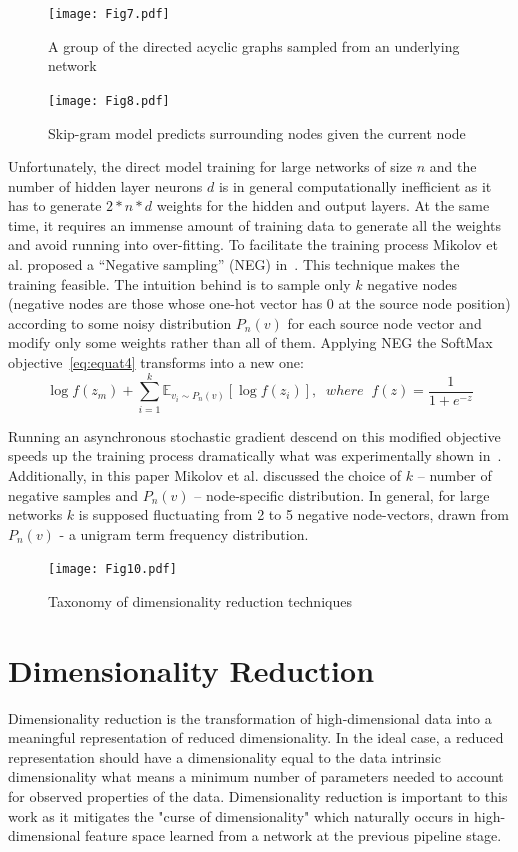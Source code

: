 \begin{figure}[H]
    \centering
    \texttt{[image: Fig7.pdf]}
    \caption{A group of the directed acyclic graphs sampled from an underlying network}
    \label{fig:Fig7}
\end{figure}
\begin{figure}[H]
    \centering
    \texttt{[image: Fig8.pdf]}
    \caption{Skip-gram model predicts surrounding nodes given the current node}
    \label{fig:Fig8}
\end{figure}

Unfortunately, the direct model training for large networks of size $n$ and the number of hidden layer neurons $d$ is in general computationally inefficient as it has to generate $2*n*d$ weights for the hidden and output layers. At the same time, it requires an immense amount of training data to generate all the weights and avoid running into over-fitting. 
To facilitate the training process Mikolov et al. proposed a “Negative sampling” (NEG) in~\cite{gutmann2012noise}. This technique makes the training feasible. The intuition behind is to sample only $k$ negative nodes (negative nodes are those whose one-hot vector has 0 at the source node position) according to some noisy distribution $P_n(v)$ for each source node vector and modify only some weights rather than all of them. Applying NEG the SoftMax objective~\autoref{eq:equat4} transforms into a new one:
\begin{equation}
  \log{f(z_m)} + \sum\limits_{i=1}^k \mathbb{E}_{v_i\sim P_n(v)} [\log{f(z_i)}],\;\; 
  where \;\; f(z)= \frac{1}{1+e^{-z}}
    \label{eq:equat5}
\end{equation}

Running an asynchronous stochastic gradient descend on this modified objective speeds up the training process dramatically what was experimentally shown in~\cite{Mikolov:Word2vec}. Additionally, in this paper Mikolov et al. discussed the choice of $k$ – number of negative samples and $P_n(v)$ – node-specific distribution. In general, for large networks $k$ is supposed fluctuating from 2 to 5 negative node-vectors, drawn from $P_n(v)$ - a unigram term frequency distribution.

\begin{figure}[H]
    \centering
    \texttt{[image: Fig10.pdf]}
    \caption{Taxonomy of dimensionality reduction techniques}
    \label{fig:Fig10}
\end{figure}

\section{Dimensionality Reduction}
\label{Dimensionality Reduction}
Dimensionality reduction is the transformation of high-dimensional data into a meaningful representation of reduced dimensionality. In the ideal case, a reduced representation should have a dimensionality equal to the data intrinsic dimensionality what means a minimum number of parameters needed to account for observed properties of the data. Dimensionality reduction is important to this work as it mitigates the "curse of dimensionality" which naturally occurs in high-dimensional feature space learned from a network at the previous pipeline stage.

